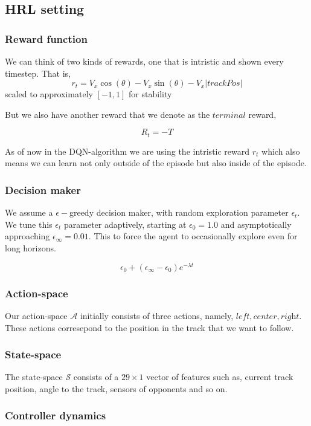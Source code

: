 \documentclass{article}
\begin{document}
\subsection{HRL setting}

\subsubsection{Reward function}

We can think of two kinds of rewards, one that is intristic and shown every timestep. That is,  
\[
r_t = V_x \cos(\theta) - V_x\sin(\theta)-V_x|trackPos|
\]
scaled to approximately $[-1,1]$ for stability

But we also have another reward that we denote as the $\textit{terminal}$ reward,

\[
R_t = -T
\]

As of now in the DQN-algorithm we are using the intristic reward $r_t$ which also means we can learn not only outside of the episode but also inside of the episode.

\subsubsection{Decision maker}
We assume a $\epsilon-$greedy decision maker, with random exploration parameter $\epsilon_t$. We tune this $\epsilon_t$ parameter adaptively, starting at $\epsilon_0 = 1.0$ and asymptotically approaching $\epsilon_\infty = 0.01$. This to force the agent to occasionally explore even for long horizons.

\[
	\epsilon_0 + (\epsilon_\infty - \epsilon_0) e^{-\lambda t}
\]


\subsubsection{Action-space}
Our action-space $\mathcal{A}$ initially consists of three actions, namely, $\textit{left}, \textit{center}, \textit{right}$. These actions corresepond to the position in the track that we want to follow. 

\subsubsection{State-space}
The state-space $\mathcal{S}$ consists of a $29\times1$ vector of features such as, current track position, angle to the track, sensors of opponents and so on.

\subsubsection{Controller dynamics}
\end{document}
